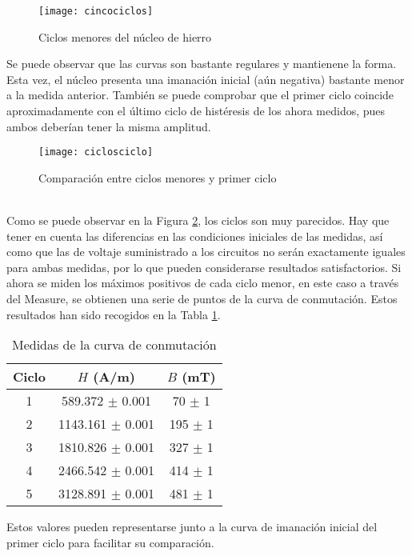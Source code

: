 \documentclass[fleqn,11pt]{SelfArx} %
\begin{document}
\begin{figure}[ht!]\centering
	\texttt{[image: cincociclos]}
	\caption{Ciclos menores del núcleo de hierro}
	\label{fig:cincociclos}
\end{figure}
Se puede observar que las curvas son bastante regulares y mantienene la forma. Esta vez, el núcleo presenta una imanación inicial (aún negativa) bastante menor a la medida anterior. También se puede comprobar que el primer ciclo coincide aproximadamente con el último ciclo de histéresis de los ahora medidos, pues ambos deberían tener la misma amplitud. 
\begin{figure}[ht!]\centering
	\texttt{[image: ciclosciclo]}
	\caption{Comparación entre ciclos menores y primer ciclo}
	\label{fig:ciclosciclo}
\end{figure}\\

Como se puede observar en la Figura \ref{fig:ciclosciclo}, los ciclos son muy parecidos. Hay que tener en cuenta las diferencias en las condiciones iniciales de las medidas, así como que las de voltaje suministrado a los circuitos no serán exactamente iguales para ambas medidas, por lo que pueden considerarse resultados satisfactorios. Si ahora se miden los máximos positivos de cada ciclo menor, en este caso a través del Measure, se obtienen una serie de puntos de la curva de conmutación. Estos resultados han sido recogidos en la Tabla \ref{tab:esquizofrenia}.\\

\begin{table}[htb!]
	\centering
	\begin{tabular}{c c c}
		\toprule
		Ciclo & $H$ (A/m)& $B$ (mT) \\
		\midrule[1px]
		1 & 589.372 $\pm$ 0.001  &  70 $\pm$ 1\\
		2 & 1143.161 $\pm$ 0.001  &  195 $\pm$ 1\\
		3 & 1810.826 $\pm$ 0.001  &  327 $\pm$ 1\\
		4 & 2466.542 $\pm$ 0.001  &  414 $\pm$ 1\\
		5 & 3128.891 $\pm$ 0.001 & 481 $\pm$ 1 \\
		\bottomrule
	\end{tabular}
	\caption{Medidas de la curva de conmutación}
	\label{tab:esquizofrenia}
\end{table}

Estos valores pueden representarse junto a la curva de imanación inicial del primer ciclo para facilitar su comparación.
\end{document}
